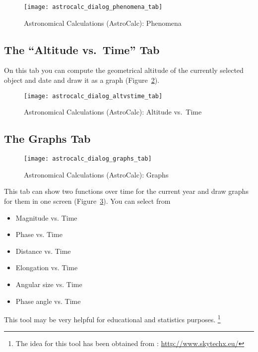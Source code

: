 \begin{figure}[htbp]
\centering\texttt{[image: astrocalc\_dialog\_phenomena\_tab]}
\caption{Astronomical Calculations (AstroCalc): Phenomena}
\label{fig:gui:AstroCalc:Phenomena}
\end{figure}


\subsection{The ``Altitude vs.\ Time'' Tab}
\label{sec:gui:AstroCalc:AltVsTime}
  
On this tab you can compute the geometrical altitude of the currently selected object 
and date and draw it as a graph (Figure~\ref{fig:gui:AstroCalc:AltVsTime}).
    
\begin{figure}[htbp]
\centering\texttt{[image: astrocalc\_dialog\_altvstime\_tab]}
\caption{Astronomical Calculations (AstroCalc): Altitude vs.\ Time}
\label{fig:gui:AstroCalc:AltVsTime}
\end{figure}

\newpage
\subsection{The Graphs Tab}
\label{sec:gui:AstroCalc:Graphs}
    
\begin{figure}[htbp]
\centering\texttt{[image: astrocalc\_dialog\_graphs\_tab]}
\caption{Astronomical Calculations (AstroCalc): Graphs}
\label{fig:gui:AstroCalc:Graphs}
\end{figure}
  
\noindent{}This tab can show two functions over time for the current year and draw graphs for them in one screen (Figure~\ref{fig:gui:AstroCalc:Graphs}). 
You can select from 
\begin{itemize}
\item Magnitude vs. Time
\item Phase vs. Time
\item Distance vs. Time 
\item Elongation vs. Time 
\item Angular size vs. Time
\item Phase angle vs. Time
\end{itemize}

This tool may be very helpful for educational and statistics purposes.%
	\footnote{The idea for this tool has been obtained from : \url{http://www.skytechx.eu/}}

